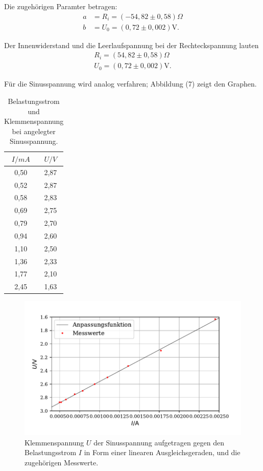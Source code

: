 Die zugehörigen Paramter betragen:
\begin{align*}
a &= R_i = (-54,82 \pm 0,58)\Omega \\
b &= U_0 =  (0,72 \pm 0,002)\si{\volt} .
\end{align*}

Der Innenwiderstand und die Leerlaufspannung bei der Rechteckspannung lauten\begin{align*}
R_i = (54,82 \pm 0,58)\Omega \\
U_0 =  (0,72 \pm 0,002)\si{\volt} .
\end{align*}

Für die Sinusspannung wird analog verfahren; Abbildung (7) zeigt den Graphen.

\begin{table}[H]
  \centering
  \caption{Belastungsstrom und Klemmenspannung bei angelegter Sinusspannung.}
  \begin{tabular}{c c}
    \toprule
     $I/mA$ & $U/V$  \\
    \midrule
    0,50 & 2,87 \\
    0,52 & 2,87 \\
    0,58 & 2,83 \\
    0,69 & 2,75 \\
    0,79 & 2,70 \\
    0,94 & 2,60 \\
    1,10 & 2,50 \\
    1,36 & 2,33 \\
    1,77 & 2,10 \\
    2,45 & 1,63 \\
  \bottomrule
  \end{tabular}
\end{table}

\begin{figure}[H]
  \centering
  \includegraphics{plot4.pdf}
  \caption{Klemmenspannung $U$ der Sinusspannung aufgetragen gegen den Belastungsstrom $I$ in Form einer linearen Ausgleichsgeraden, und die zugehörigen Messwerte.}
  \label{fig:rechteck}
\end{figure}

